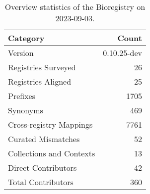 \begin{table}
\caption{Overview statistics of the Bioregistry on 2023-09-03.}
\label{tab:bioregistry-summary}
\begin{tabular}{lr}
\toprule
Category & Count \\
\midrule
Version & 0.10.25-dev \\
Registries Surveyed & 26 \\
Registries Aligned & 25 \\
Prefixes & 1705 \\
Synonyms & 469 \\
Cross-registry Mappings & 7761 \\
Curated Mismatches & 52 \\
Collections and Contexts & 13 \\
Direct Contributors & 42 \\
Total Contributors & 360 \\
\bottomrule
\end{tabular}
\end{table}
